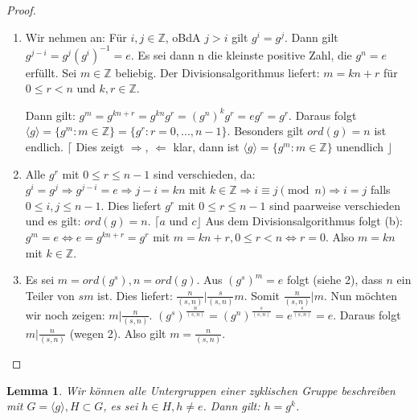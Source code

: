 \documentclass[12pt]{scrartcl}%
\newtheorem{lemma}{Lemma}
\theoremstyle{definition}
\theoremstyle{remark}
\begin{document}
\begin{proof}
	\begin{enumerate}
		\item Wir nehmen an: Für $i,j \in \mathbb{Z}$, oBdA $j>i$ gilt $g^{i}=g^{j}$.
		Dann gilt $g^{j-i}=g^{j}(g^{i})^{-1}=e$.
		Es sei dann n die kleinste positive Zahl, die $g^{n}=e$ erfüllt.
		Sei $m \in \mathbb{Z}$ beliebig.
		Der Divisionsalgorithmus liefert: $m=kn+r$ für $0 \leq r < n$ und $k,r \in \mathbb{Z}$.

		Dann gilt:
		$g^{m}=g^{kn+r}=g^{kn}g^{r}=(g^{n})^{k}g^{r}=eg^{r}=g^{r}$.
		Daraus folgt $\langle g \rangle = \lbrace g^{m} : m \in \mathbb{Z}\rbrace = \lbrace g^{r} : r=0,...,n-1\rbrace$.
		Besonders gilt $ord(g)=n$ ist endlich.
		$\lceil$ Dies zeigt $\Rightarrow$, $\Leftarrow$ klar, dann ist $\langle g \rangle = \lbrace g^{m} : m \in \mathbb{Z}\rbrace$ unendlich $\rfloor$
		\item Alle $g^{r}$ mit $0 \leq r \leq n-1$ sind verschieden, da:
		$g^{i}=g^{j} \Rightarrow g^{j-i}=e \Rightarrow j-i = kn$ mit $k\in\mathbb{Z} \Rightarrow i \equiv j \pmod{n} \Rightarrow i=j$ falls $0\leq i,j\leq n-1$.
		Dies liefert $g^{r}$ mit $0 \leq r \leq n-1$ sind paarweise verschieden und es gilt: $ord(g)=n$. $\lceil a$ und $c\rfloor$
		Aus dem Divisionsalgorithmus folgt (b): $g^{m}=e \Leftrightarrow e=g^{kn+r}=g^{r}$ mit $m = kn+r, 0 \leq r < n \Leftrightarrow r=0$.
		Also $m=kn$ mit $k \in \mathbb{Z}$. %
		\item Es sei $m=ord(g^{s}), n =ord(g)$.
		Aus $(g^{s})^{m}=e$ folgt (siehe 2), dass $n$ ein Teiler von $sm$ ist.
		Dies liefert: $\frac{n}{(s,n)} \vert \frac{s}{(s,n)}m$. Somit $\frac{n}{(s,n)} \vert m$.
		Nun möchten wir noch zeigen: $m \vert \frac{n}{(s,n)}$. $(g^{s})^{\frac{n}{(s,n)}} = (g^{n})^{\frac{s}{(s,n)}}=e^{\frac{s}{(s,n)}}=e$.
		Daraus folgt $m \vert \frac{n}{(s,n)}$ (wegen 2).
		Also gilt $m = \frac{n}{(s,n)}$. \qedhere
	\end{enumerate}
\end{proof}

\begin{lemma}
	Wir können alle Untergruppen einer zyklischen Gruppe beschreiben mit $G = \langle g \rangle, H \subset G$, es sei $h \in H, h \neq e$. Dann gilt: $h = g^{k}$. %
\end{lemma}
\end{document}
